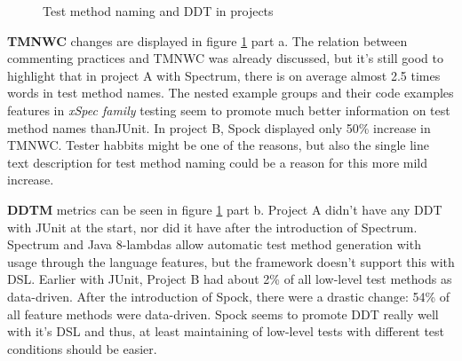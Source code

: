     \begin{figure}[H]%
        \centering
        \qquad
        \caption{Test method naming and DDT in projects}%
        \label{fig:tmnwc-ddtm}%
    \end{figure}

\textbf{TMNWC} changes are displayed in figure \ref{fig:tmnwc-ddtm} part a. The relation between commenting practices
and TMNWC was already discussed, but it's still good to highlight that in project A with Spectrum, there is on average
almost 2.5 times words in test method names. The nested example groups and their code examples features in \textit{xSpec family} testing
seem to promote much better information on test method names than\restoregeometry \noindent  JUnit. In project B, Spock displayed only 50\% increase in TMNWC.
Tester habbits might be one of the reasons, but also the single line text description for test method naming could be a
reason for this more mild increase.

\textbf{DDTM} metrics can be seen in figure \ref{fig:tmnwc-ddtm} part b. Project A didn't have any DDT with JUnit at the start,
nor did it have after the introduction of Spectrum. Spectrum and Java 8-lambdas allow automatic test method generation with
usage through the language features, but the framework doesn't support this with DSL. Earlier with JUnit, Project B had about 2\% of
all low-level test methods as data-driven. After the introduction of Spock, there were a drastic change:
 54\% of all
feature methods were data-driven.
Spock seems to promote DDT really well with it's DSL and thus, at least maintaining of low-level tests with different
test conditions should be easier.


